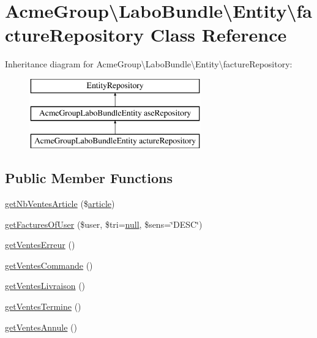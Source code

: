 \hypertarget{class_acme_group_1_1_labo_bundle_1_1_entity_1_1facture_repository}{\section{Acme\+Group\textbackslash{}Labo\+Bundle\textbackslash{}Entity\textbackslash{}facture\+Repository Class Reference}
\label{class_acme_group_1_1_labo_bundle_1_1_entity_1_1facture_repository}
}
Inheritance diagram for Acme\+Group\textbackslash{}Labo\+Bundle\textbackslash{}Entity\textbackslash{}facture\+Repository\+:\begin{figure}[H]
\begin{center}
\leavevmode
\includegraphics[height=3.000000cm]{class_acme_group_1_1_labo_bundle_1_1_entity_1_1facture_repository}
\end{center}
\end{figure}
\subsection*{Public Member Functions}
\begin{DoxyCompactItemize}
\item 
\hyperlink{class_acme_group_1_1_labo_bundle_1_1_entity_1_1facture_repository_a9cb42d53e8e08a8bdaa02474ee209ec8}{get\+Nb\+Ventes\+Article} (\$\hyperlink{class_acme_group_1_1_labo_bundle_1_1_entity_1_1article}{article})
\item 
\hyperlink{class_acme_group_1_1_labo_bundle_1_1_entity_1_1facture_repository_ae322dd50a056126c7fdc22ddf9f20444}{get\+Factures\+Of\+User} (\$user, \$tri=\hyperlink{validate_8js_afb8e110345c45e74478894341ab6b28e}{null}, \$sens=\char`\"{}D\+E\+S\+C\char`\"{})
\item 
\hyperlink{class_acme_group_1_1_labo_bundle_1_1_entity_1_1facture_repository_ad926280be785e34f2e4c278ffb245bfb}{get\+Ventes\+Erreur} ()
\item 
\hyperlink{class_acme_group_1_1_labo_bundle_1_1_entity_1_1facture_repository_afbf90a175bd7c3f541ede38cc439a913}{get\+Ventes\+Commande} ()
\item 
\hyperlink{class_acme_group_1_1_labo_bundle_1_1_entity_1_1facture_repository_a5d5fb23d86c37020ffcc80541fc148cd}{get\+Ventes\+Livraison} ()
\item 
\hyperlink{class_acme_group_1_1_labo_bundle_1_1_entity_1_1facture_repository_acf4ecd392b6019698c520ccf824b0a61}{get\+Ventes\+Termine} ()
\item 
\hyperlink{class_acme_group_1_1_labo_bundle_1_1_entity_1_1facture_repository_a7adf2e22564d634133e2ebda0ae5d81b}{get\+Ventes\+Annule} ()
\end{DoxyCompactItemize}
